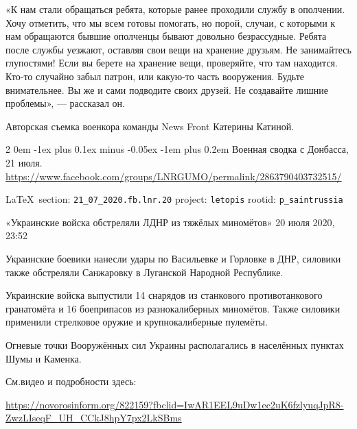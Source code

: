 \documentclass[a4paper,11pt]{extreport}
\makeatletter
\renewcommand\subsection{%
  \clearpage
    \@startsection{subsection}%
    {2}%
    {0em}%
    {-1ex plus 0.1ex minus -0.05ex}%
    {-1em plus 0.2em}%
    {\scshape\bfseries\Large}%
}
\makeatother
\begin{document}
«К нам стали обращаться ребята, которые ранее проходили службу в ополчении.
Хочу отметить, что мы всем готовы помогать, но порой, случаи, с которыми к нам
обращаются бывшие ополченцы бывают довольно безрассудные. Ребята после службы
уезжают, оставляя свои вещи на хранение друзьям. Не занимайтесь глупостями!
Если вы берете на хранение вещи, проверяйте, что там находится. Кто-то случайно
забыл патрон, или какую-то часть вооружения. Будьте внимательнее. Вы же и сами
подводите своих друзей. Не создавайте лишние проблемы», --- рассказал он.

Авторская съемка военкора команды News Front Катерины Катиной.
  
 
 
  
\subsection{Военная сводка с Донбасса, 21 июля.}
\label{sec:21_07_2020.fb.lnr.20}
\url{https://www.facebook.com/groups/LNRGUMO/permalink/2863790403732515/}

\vspace{0.5cm}
{\small\LaTeX~section: \verb|21_07_2020.fb.lnr.20| project: \verb|letopis| rootid: \verb|p_saintrussia|}
\vspace{0.5cm}

«Украинские войска обстреляли ЛДНР из тяжёлых миномётов» 20 июля 2020, 23:52

Украинские боевики нанесли удары по Васильевке и Горловке в ДНР, силовики также
обстреляли Санжаровку в Луганской Народной Республике.

Украинские войска выпустили 14 снарядов из станкового противотанкового
гранатомёта и 16 боеприпасов из разнокалиберных миномётов.  Также силовики
применили стрелковое оружие и крупнокалиберные пулемёты.

Огневые точки Вооружённых сил Украины располагались в населённых пунктах Шумы и
Каменка.

См.видео и подробности здесь:

\url{https://novorosinform.org/822159?fbclid=IwAR1EEL9uDw1ec2uK6fzlyuqJpR8-ZwzLIseqF_UH_CCkJ8hpY7px2LkSBms}
  
 
\end{document}
